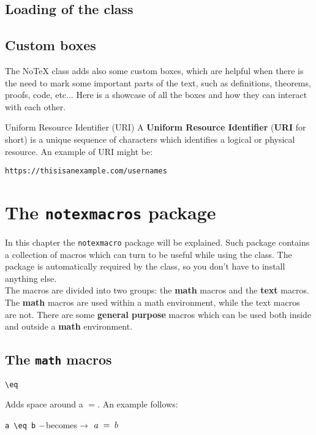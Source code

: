 \documentclass[]{notex}
\newcommand{\becomes}[1]{\hspace{#1} $\--$becomes$\rightarrow$ \hspace{#1}}
\begin{document}
\section{Loading of the class}

\section{Custom boxes}

The NoTeX class adds also some custom boxes, which are helpful when there is the need to mark some important parts of the text, such as definitions, theorems, proofs, code, etc... Here is a showcase of all the boxes and how they can interact with each other.

\begin{definition}{Uniform Resource Identifier (URI)}
    A \textbf{Uniform Resource Identifier} (\textbf{URI} for short) is a unique sequence of characters which identifies a logical or physical resource. An example of URI might be:
    
    \medskip

    \texttt{https://thisisanexample.com/usernames}
\end{definition}

\chapter{The \texttt{notexmacros} package}

\noindent In this chapter the \texttt{notexmacro} package will be explained. Such package contains a collection of macros which can turn to be useful while using the class. The package is automatically required by the class, so you don't have to install anything else.
\\
\indent The macros are divided into two groups: the \textbf{math} macros and the \textbf{text} macros. The \textbf{math} macros are used within a math environment, while the text macros are not. There are some \textbf{general purpose} macros which can be used both inside and outside a \textbf{math} environment.

\section{The \texttt{math} macros}

\begin{tcolorbox}
    \verb|\eq|
\end{tcolorbox}

\noindent Adds space around a $=$. An example follows:
\begin{center}
    \verb|a \eq b| \becomes{20pt} $a \; = \; b$
\end{center}
\end{document}
